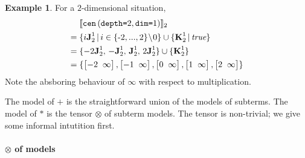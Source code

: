 \documentclass[9pt]{sigplanconf}
\newcounter{block}
\theoremstyle{definition}
\newtheorem{example}[block]{Example}
\newcommand{\interp}[1]{\llbracket{#1}\rrbracket}
\newcommand{\term}[1]{\texttt{#1}}
\newcommand{\stenCenS}[2]{\term{cen} \, (\term{depth=}#1,
  \term{dim=}#2)}
\newcommand{\vtwoh}[2]{\setlength{\arraycolsep}{0em}
\left[\begin{array}{cc}#1 \; & \; #2\end{array}\right]}
\newcommand{\singleEntry}[2]{\textbf{J}_{#2}^{#1}}
\newcommand{\zeroEntry}[2]{\textbf{K}_{#2}^{#1}}
\begin{document}
\begin{example}
For a $2$-dimensional situation, 
\begin{align*}
& \interp{\stenCenS{2}{1}}_2 \\
= \; & \{i\singleEntry{1}{2} \,|\, i \in \{\text{-}2,..., 2\}\!\setminus\!0 \}
  \cup  \{ \zeroEntry{1}{2} \,|\, \textit{true} \} \\
= \; & \{-2\singleEntry{1}{2}, \, -\singleEntry{1}{2}, \,
  \singleEntry{1}{2}, \, 2\singleEntry{1}{2}\} \cup
  \{\zeroEntry{1}{2}\} \\
= \; & \{\vtwoh{-2}{\infty}, \vtwoh{-1}{\infty}, \vtwoh{0}{\infty}, 
\vtwoh{1}{\infty}, \vtwoh{2}{\infty}\} 
\end{align*}
Note the absboring behaviour of $\infty$ with respect to
multiplication. 
\end{example}
\noindent
The model of $\term{+}$ is the straightforward union of 
the models of subterms. The model of $\term{*}$ is
the tensor $\otimes$ of subterm models. The tensor 
is non-trivial; we give some informal intutition first.

\paragraph{$\otimes$ of models}
\end{document}
